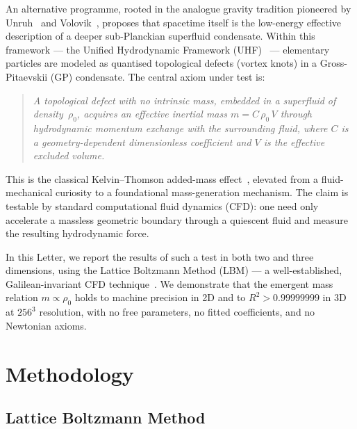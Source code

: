 \documentclass[reprint,amsmath,amssymb,aps,pre,floatfix]{revtex4-2}
\begin{document}
An alternative programme, rooted in the analogue gravity tradition pioneered
by Unruh~\cite{Unruh1981} and Volovik~\cite{Volovik2003}, proposes that
spacetime itself is the low-energy effective description of a deeper
sub-Planckian superfluid condensate.  Within this framework --- the Unified
Hydrodynamic Framework (UHF)~\cite{Amit2026} --- elementary particles are
modeled as quantised topological defects (vortex knots) in a
Gross-Pitaevskii (GP) condensate.  The central axiom under test is:

\begin{quote}
\emph{A topological defect with no intrinsic mass, embedded in a superfluid
of density~$\rho_0$, acquires an effective inertial mass
$m=C\,\rho_0\,V$ through hydrodynamic momentum exchange with the
surrounding fluid, where $C$ is a geometry-dependent dimensionless
coefficient and $V$ is the effective excluded volume.}
\end{quote}

This is the classical Kelvin--Thomson added-mass
effect~\cite{Kelvin1868,Lamb1932}, elevated from a fluid-mechanical
curiosity to a foundational mass-generation mechanism.  The claim is
testable by standard computational fluid dynamics (CFD): one need only
accelerate a massless geometric boundary through a quiescent fluid and
measure the resulting hydrodynamic force.

In this Letter, we report the results of such a test in both two and three
dimensions, using the Lattice Boltzmann Method (LBM) --- a well-established,
Galilean-invariant CFD technique~\cite{Chen1998}.  We demonstrate that the
emergent mass relation $m\propto\rho_0$ holds to machine precision in 2D
and to $R^{2}>0.99999999$ in 3D at $256^{3}$ resolution, with no free
parameters, no fitted coefficients, and no Newtonian axioms.

\section{Methodology}
\label{sec:method}

\subsection{Lattice Boltzmann Method}
\label{sec:lbm}
\end{document}
